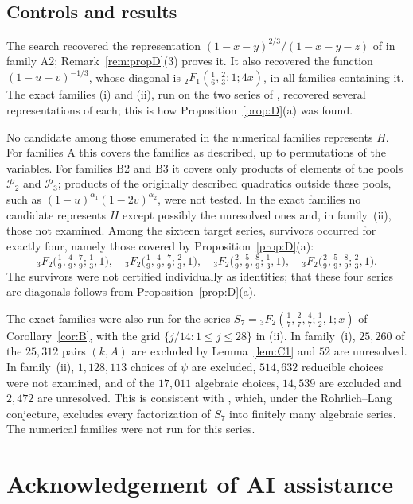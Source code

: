 \documentclass[11pt]{amsart}
\theoremstyle{definition}
\theoremstyle{remark}
\numberwithin{equation}{section}
\begin{document}
\subsection*{Controls and results}
The search recovered the representation $(1-x-y)^{2/3}/(1-x-y-z)$ of \citet{AbdelazizKoutschanMaillard2020} in family A2; Remark~\ref{rem:propD}(3) proves it. It also recovered the function $(1-u-v)^{-1/3}$, whose diagonal is ${}_2F_1(\frac16,\frac23;1;4x)$, in all families containing it. The exact families (i) and (ii), run on the two series of \citet{AbdelazizKoutschanMaillard2020}, recovered several representations of each; this is how Proposition~\ref{prop:D}(a) was found.

No candidate among those enumerated in the numerical families represents $H$. For families A this covers the families as described, up to permutations of the variables. For families B2 and B3 it covers only products of elements of the pools $\mathcal P_2$ and $\mathcal P_3$; products of the originally described quadratics outside these pools, such as $(1-u)^{\alpha_1}(1-2v)^{\alpha_2}$, were not tested. In the exact families no candidate represents $H$ except possibly the unresolved ones and, in family~(ii), those not examined. Among the sixteen target series, survivors occurred for exactly four, namely those covered by Proposition~\ref{prop:D}(a):
\[
{}_3F_2\big(\tfrac19,\tfrac49,\tfrac79;\tfrac13,1\big),\quad{}_3F_2\big(\tfrac19,\tfrac49,\tfrac79;\tfrac23,1\big),\quad{}_3F_2\big(\tfrac29,\tfrac59,\tfrac89;\tfrac13,1\big),\quad{}_3F_2\big(\tfrac29,\tfrac59,\tfrac89;\tfrac23,1\big).
\]
The survivors were not certified individually as identities; that these four series are diagonals follows from Proposition~\ref{prop:D}(a).

The exact families were also run for the series $S_7={}_3F_2(\frac17,\frac27,\frac47;\frac12,1;x)$ of Corollary~\ref{cor:B}, with the grid $\{j/14:1\le j\le28\}$ in (ii). In family~(i), $25{,}260$ of the $25{,}312$ pairs $(k,A)$ are excluded by Lemma~\ref{lem:C1} and $52$ are unresolved. In family~(ii), $1{,}128{,}113$ choices of $\psi$ are excluded, $514{,}632$ reducible choices were not examined, and of the $17{,}011$ algebraic choices, $14{,}539$ are excluded and $2{,}472$ are unresolved. This is consistent with \citet[Proposition~1]{RivoalRoques2014}, which, under the Rohrlich--Lang conjecture, excludes every factorization of $S_7$ into finitely many algebraic series. The numerical families were not run for this series.

\section*{Acknowledgement of AI assistance}
\end{document}
